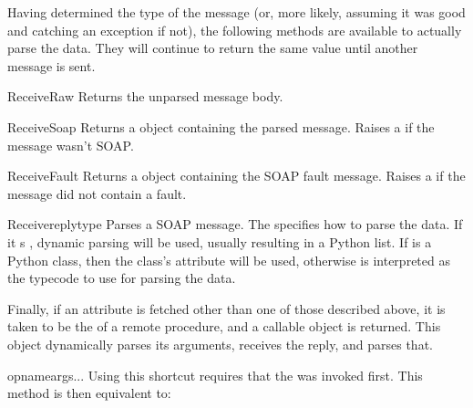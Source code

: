 Having determined the type of the message (or, more likely, assuming
it was good and catching an exception if not), the following methods
are available to actually parse the data.
They will continue to return the same value until
another message is sent.

\begin{methoddesc}{ReceiveRaw}{}
Returns the unparsed message body.
\end{methoddesc}

\begin{methoddesc}{ReceiveSoap}{}
Returns a  object containing the parsed message.
Raises a  if the message wasn't SOAP.
\end{methoddesc}

\begin{methoddesc}{ReceiveFault}{}
Returns a  object containing the SOAP fault message.
Raises a  if the message did not contain a fault.
\end{methoddesc}

\begin{methoddesc}{Receive}{replytype}
Parses a SOAP message.
The  specifies how to parse the data.
If it s , dynamic parsing will be used, usually resulting
in a Python list.
If  is a Python class, then the class's 
attribute will be used, otherwise  is interpreted as
the typecode to use for parsing the data.
\end{methoddesc}

Finally, if an attribute is fetched other than one of those described
above, it is taken to be the  of a remote procedure,
and a callable object is returned.
This object dynamically parses its arguments, receives the reply, and
parses that.

\begin{methoddesc}{opname}{args...}
Using this shortcut requires that the  was invoked first.
This method is then equivalent to:
\end{methoddesc}

